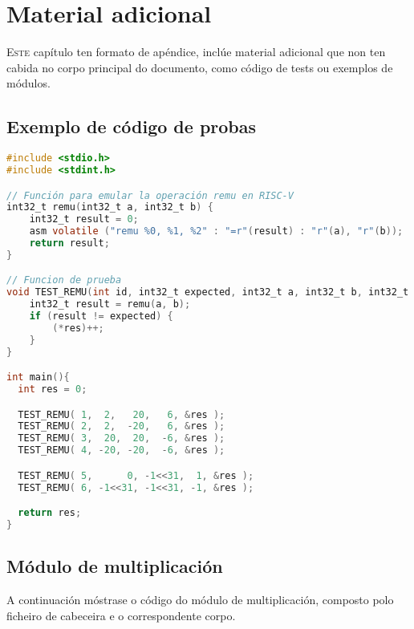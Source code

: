 \appendix
\chapter{Material adicional}
\label{chap:adicional}

\lettrine{E}{ste} capítulo ten formato de apéndice, inclúe material adicional que non ten cabida no corpo principal do documento, como código de tests ou exemplos de módulos.

\section{Exemplo de código de probas}
\label{cod_test}

\begin{lstlisting}[language=C]
#include <stdio.h>
#include <stdint.h>

// Función para emular la operación remu en RISC-V
int32_t remu(int32_t a, int32_t b) {
    int32_t result = 0;
    asm volatile ("remu %0, %1, %2" : "=r"(result) : "r"(a), "r"(b));
    return result;
}

// Funcion de prueba
void TEST_REMU(int id, int32_t expected, int32_t a, int32_t b, int32_t *res) {
    int32_t result = remu(a, b); 
    if (result != expected) {
        (*res)++;
    }
}

int main(){
  int res = 0;

  TEST_REMU( 1,  2,   20,   6, &res );
  TEST_REMU( 2,  2,  -20,   6, &res );
  TEST_REMU( 3,  20,  20,  -6, &res );
  TEST_REMU( 4, -20, -20,  -6, &res );

  TEST_REMU( 5,      0, -1<<31,  1, &res );
  TEST_REMU( 6, -1<<31, -1<<31, -1, &res );

  return res;
}
\end{lstlisting}

\section{Módulo de multiplicación}
\label{mul_module}
A continuación móstrase o código do módulo de multiplicación, composto polo ficheiro de cabeceira e o correspondente corpo. 

